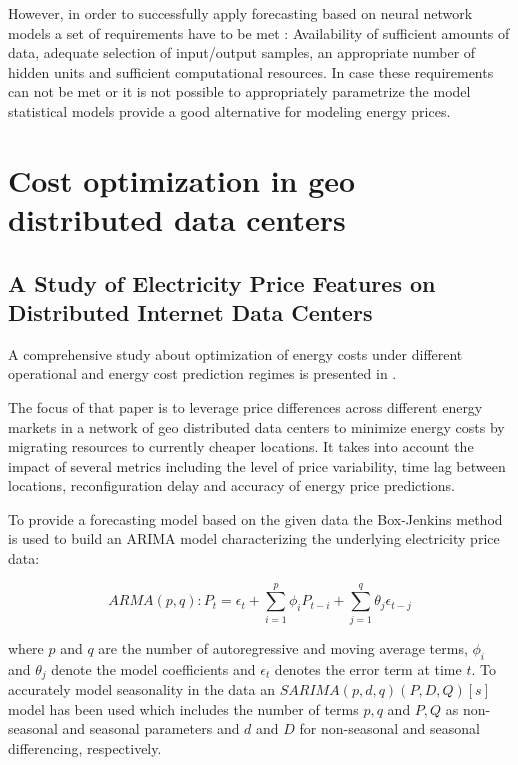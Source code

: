 However, in order to successfully apply forecasting based on neural network models a set of requirements have to be met \cite{catalao2007short}: Availability of sufficient amounts of data, adequate selection of input/output samples, an appropriate number of hidden units and sufficient computational resources. In case these requirements can not be met or it is not possible to appropriately parametrize the model statistical models provide a good alternative for modeling energy prices. 




\section{Cost optimization in geo distributed data centers}


\subsection{A Study of Electricity Price Features on Distributed Internet Data Centers}

A comprehensive study about optimization of energy costs under different operational and energy cost prediction regimes is presented in \cite{de2013study}. 

The focus of that paper is to leverage price differences across different energy markets in a network of geo distributed data centers to minimize energy costs by migrating resources to currently cheaper locations. It takes into account the impact of several metrics including the level of price variability, time lag between locations, reconfiguration delay and accuracy of energy price predictions. 

To provide a forecasting model based on the given data the Box-Jenkins method is used to build an ARIMA model characterizing the underlying electricity price data:

\[ ARMA(p,q) : P_t = \epsilon_t + \sum_{i=1}^{p}{\phi_i P_{t-i}} + \sum_{j=1}^{q}{\theta_j \epsilon_{t-j}}\] 

where $p$ and $q$ are the number of autoregressive and moving average terms, $\phi_i$ and $\theta_j$ denote the model coefficients and $\epsilon_t$ denotes the error term at time $t$. To accurately model seasonality in the data an $SARIMA(p,d,q)(P,D,Q)[s]$ model has been used which includes the number of terms $p,q$ and $P,Q$ as non-seasonal and seasonal parameters and $d$ and $D$ for non-seasonal and seasonal differencing, respectively. 

